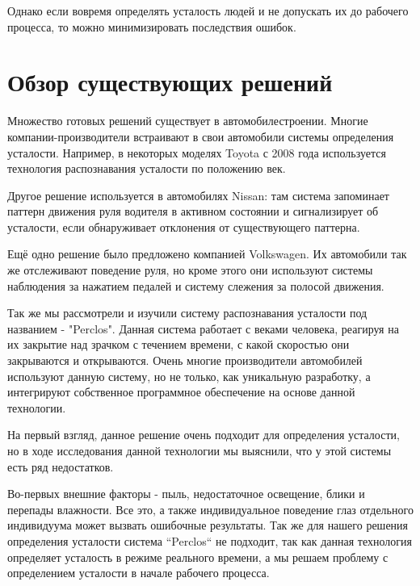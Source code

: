 \documentclass[12pt, letterpaper]{article}
\begin{document}
    Однако если вовремя определять усталость людей и не допускать их до рабочего процесса, то можно минимизировать последствия ошибок.

 \section{Обзор существующих решений}\label{sec:approaches-review}
 
    Множество готовых решений существует в автомобилестроении. Многие компании-производители встраивают в свои автомобили системы определения усталости. Например, в некоторых моделях Toyota с 2008 года используется технология распознавания усталости по положению век.
    
    Другое решение используется в автомобилях Nissan: там система запоминает паттерн движения руля водителя в активном состоянии и сигнализирует об усталости, если обнаруживает отклонения от существующего паттерна.
    
    Ещё одно решение было предложено компанией Volkswagen. Их автомобили так же отслеживают поведение руля, но кроме этого они используют системы наблюдения за нажатием педалей и систему слежения за полосой движения.\cite{sikander_driver_2019}
    
    Так же мы рассмотрели и изучили систему распознавания усталости под названием - "Perclos". Данная система работает с веками человека, реагируя на их закрытие над зрачком с течением времени, с какой скоростью они закрываются и открываются. Очень многие производители автомобилей используют данную систему, но не только, как уникальную разработку, а интегрируют собственное программное обеспечение на основе данной технологии.
    
    На первый взгляд, данное решение очень подходит для определения усталости, но в ходе исследования данной технологии мы выяснили, что у этой системы есть ряд недостатков. 

    Во-первых внешние факторы - пыль, недостаточное освещение, блики и перепады влажности. Все это, а также индивидуальное поведение глаз отдельного индивидуума может вызвать ошибочные результаты. Так же для нашего решения определения усталости система ``Perclos`` не подходит, так как данная технология определяет усталость в режиме реального времени, а мы решаем проблему с определением усталости в начале рабочего процесса. \cite{david_f_dinges_perclos_nodate}
    
\end{document}
